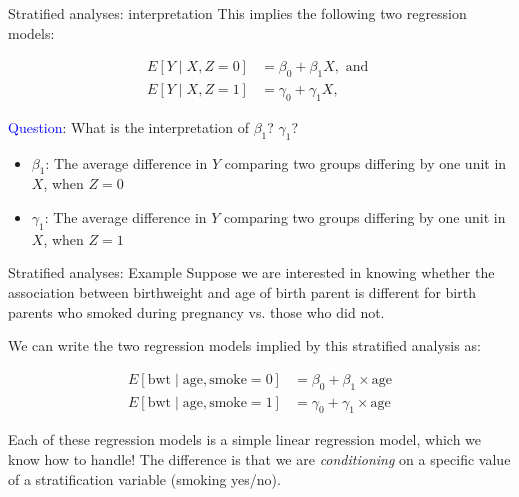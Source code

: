 \documentclass[10pt,t]{beamer}
\begin{document}
\begin{frame}{Stratified analyses: interpretation}
This implies the following two regression models:

\begin{align*}
E[Y \mid X, Z = 0] & = \beta_0 + \beta_1 X, \text{ and } \\
E[Y \mid X, Z = 1] & = \gamma_0 + \gamma_1 X,
\end{align*} 

\textcolor{blue}{Question}: What is the interpretation of $\beta_1$? $\gamma_1$? \pause

\begin{itemize}
	\item $\beta_1$: The average difference in $Y$ comparing two groups differing by one unit in $X$, when $Z = 0$ \pause
	\item $\gamma_1$: The average difference in $Y$ comparing two groups differing by one unit in $X$, when $Z = 1$
\end{itemize}
\end{frame}

\begin{frame}{Stratified analyses: Example}
Suppose we are interested in knowing whether the association between birthweight and age of birth parent is different for birth parents who smoked during pregnancy vs. those who did not.

\vspace{0.3cm}

We can write the two regression models implied by this stratified analysis as:

\begin{align*}
E[\text{bwt} \mid \text{age}, \text{smoke} = 0] & = \beta_0 + \beta_1 \times \text{age} \\
E[\text{bwt} \mid \text{age}, \text{smoke} = 1] & = \gamma_0 + \gamma_1 \times \text{age}
\end{align*}

Each of these regression models is a simple linear regression model, which we know how to handle! The difference is that we are \textit{conditioning} on a specific value of a stratification variable (smoking yes/no).


\end{frame}
\end{document}
